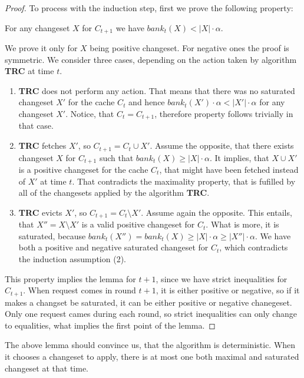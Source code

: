 \begin{proof}
To process with the induction step, first we prove the following property:
\begin{property} For any changeset $X$ for $C_{t+1}$ we have $bank_t(X) < |X|
\cdot \alpha$.  \end{property} We prove it only for $X$ being positive
changeset. For negative ones the proof is symmetric. We consider three cases,
depending on the action taken by algorithm \textbf{TRC} at time $t$.
\begin{enumerate} \item \textbf{TRC} does not perform any action. That means
that there was no saturated changeset $X'$ for the cache $C_t$ and hence
$bank_t(X') \cdot \alpha < |X'| \cdot \alpha$ for any changeset $X'$. Notice,
that $C_t = C_{t+1}$, therefore property follows trivially in that case.  \item
\textbf{TRC} fetches $X'$, so $C_{t+1} = C_t \cup X'$. Assume the opposite, that
there exists changeset $X$ for $C_{t+1}$ such that $bank_t(X) \geq |X| \cdot
\alpha$. It implies, that $X \cup X'$ is a positive changeset for the cache
$C_t$, that might have been fetched instead of $X'$ at time $t$. That
contradicts the maximality property, that is fufilled by all of the changesets
applied by the algorithm \textbf{TRC}.  \item \textbf{TRC} evicts $X'$, so
$C_{t+1}  = C_t \setminus X'$. Assume again the opposite. This entails, that
$X'' = X \setminus X'$ is a valid positive changeset for $C_t$. What is more, it
is saturated, because $bank_t(X'') = bank_t(X) \geq |X| \cdot \alpha \geq |X''|
\cdot \alpha$. We have both a positive and  negative saturated changeset for
$C_t$, which contradicts the induction assumption (2).  \end{enumerate} This
property implies the lemma for $t+1$, since we have strict inequalities for
$C_{t+1}$. When request comes in round $t+1$, it is either positive or negative,
so if it makes a changset be saturated, it can be either positive or negative
chanegeset.  Only one request cames during each round, so strict inequalities
can only change to equalities, what implies the first point of the lemma.
\end{proof} The above lemma should convince us, that the algorithm is
deterministic. When it chooses a changeset to apply, there is at most one both
maximal and saturated changeset at that time.

